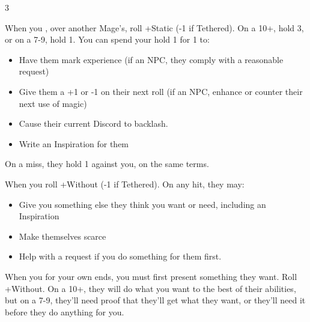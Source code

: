 



\begin{multicols}{3}

  \begin{move}
    When you ,  over another Mage’s, roll +Static (-1 if Tethered). On a 10+, hold 3, or on a 7-9, hold 1. You can spend your hold 1 for 1 to:

    \begin{itemize}
      \setlength\itemsep{-.5em}
    \item Have them mark experience (if an NPC, they comply with a reasonable request)
    \item Give them a +1 or -1 on their next roll (if an NPC, enhance or counter their next use of magic)
    \item Cause their current Discord to backlash. 
    \item Write an Inspiration for them
    \end{itemize}
    On a miss, they hold 1 against you, on the same terms.


  \end{move}

  \SEPARATOR

  \begin{move}
    When you  roll +Without (-1 if Tethered). On any hit, they may:

    \begin{itemize}
    \item Give you something else they think you want or need, including an Inspiration
    \item Make themselves scarce
    \item Help with a request if you do something for them first.
    \end{itemize}
  \end{move}

  \SEPARATOR

  \begin{move}
    When you  for your own ends, you must first present something they want. Roll +Without. On a 10+, they will do what you want to the best of their abilities, but on a 7-9, they’ll need proof that they’ll get what they want, or they’ll need it before they do anything for you.

  \end{move}


\end{multicols}
